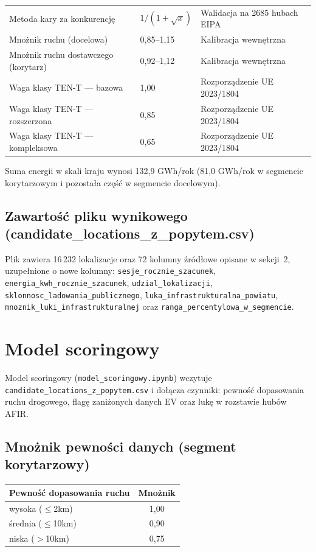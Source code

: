 \documentclass[11pt,a4paper]{article}
\begin{document}
\begin{longtable}{p{4.3cm}p{3.1cm}p{6.5cm}}
		Metoda kary za konkurencję & $1/(1+\sqrt{x})$ & Walidacja na 2685 hubach EIPA \\
		Mnożnik ruchu (docelowa) & 0,85--1,15 & Kalibracja wewnętrzna \\
		Mnożnik ruchu dostawczego (korytarz) & 0,92--1,12 & Kalibracja wewnętrzna \\
		Waga klasy TEN-T --- bazowa & 1,00 & Rozporządzenie UE 2023/1804 \\
		Waga klasy TEN-T --- rozszerzona & 0,85 & Rozporządzenie UE 2023/1804 \\
		Waga klasy TEN-T --- kompleksowa & 0,65 & Rozporządzenie UE 2023/1804 \\
		\bottomrule
	\end{longtable}
	
	Suma energii w skali kraju wynosi 132,9 GWh/rok (81,0 GWh/rok w segmencie korytarzowym i pozostała część w segmencie docelowym).
	
	\subsection{Zawartość pliku wynikowego (candidate\_locations\_z\_popytem.csv)}
	
	Plik zawiera 16\,232 lokalizacje oraz 72 kolumny źródłowe opisane w sekcji~2, uzupełnione o nowe kolumny: \texttt{sesje\_rocznie\_szacunek}, \texttt{energia\_kwh\_rocznie\_szacunek}, \texttt{udzial\_lokalizacji}, \texttt{sklonnosc\_ladowania\_publicznego}, \texttt{luka\_infrastrukturalna\_powiatu}, \texttt{mnoznik\_luki\_infrastrukturalnej} oraz \texttt{ranga\_percentylowa\_w\_segmencie}.
	
	\newpage
	\section{Model scoringowy}
	
	Model scoringowy (\texttt{model\_scoringowy.ipynb}) wczytuje \texttt{candidate\_locations\_z\_popytem.csv} i dołącza czynniki: pewność dopasowania ruchu drogowego, flagę zaniżonych danych EV oraz lukę w rozstawie hubów AFIR.
	
	\subsection{Mnożnik pewności danych (segment korytarzowy)}
	
	\begin{center}
		\begin{tabular}{lc}
			\toprule
			\textbf{Pewność dopasowania ruchu} & \textbf{Mnożnik} \\
			\midrule
			wysoka ($\leq$2km) & 1,00 \\
			średnia ($\leq$10km) & 0,90 \\
			niska ($>$10km) & 0,75 \\
			\bottomrule
		\end{tabular}
	\end{center}
	
\end{document}
